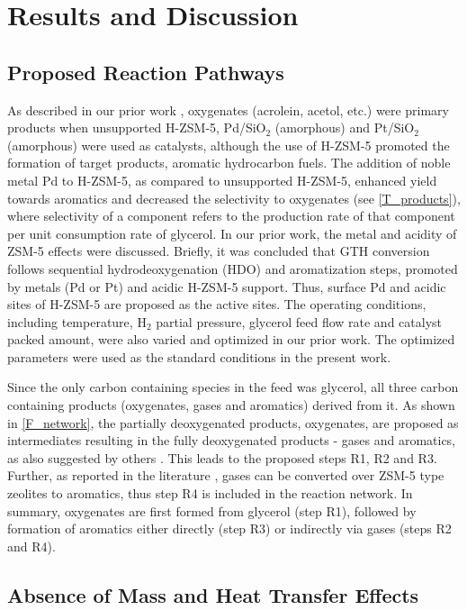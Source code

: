 \documentclass[journal=iecred,manuscript=article]{achemso}
\begin{document}
\section{Results and Discussion}

\subsection{Proposed Reaction Pathways}

As described in our prior work \cite{Xiao2016},
oxygenates (acrolein, acetol, etc.) were primary products when unsupported H-ZSM-5, Pd/SiO$_2$ (amorphous) and Pt/SiO$_2$ (amorphous) were used as catalysts,
although the use of H-ZSM-5 promoted the formation of target products, aromatic hydrocarbon fuels.
The addition of noble metal Pd to H-ZSM-5, as compared to unsupported H-ZSM-5,
enhanced yield towards aromatics and decreased the selectivity to oxygenates (see \ref{T_products}),
where selectivity of a component refers to the production rate of that component per unit consumption rate of glycerol.
In our prior work, the metal and acidity of ZSM-5 effects were discussed.
Briefly, it was concluded that GTH conversion follows sequential hydrodeoxygenation (HDO) and aromatization steps,
promoted by metals (Pd or Pt) and acidic H-ZSM-5 support.
Thus, surface Pd and acidic sites of H-ZSM-5 are proposed as the active sites.
The operating conditions, including temperature, H$_2$ partial pressure, glycerol feed flow rate and catalyst packed amount,
were also varied and optimized in our prior work.
The optimized parameters were used as the standard conditions in the present work. 

Since the only carbon containing species in the feed was glycerol,
all three carbon containing products (oxygenates, gases and aromatics) derived from it.
As shown in \ref{F_network}, the partially deoxygenated products, oxygenates,
are proposed as intermediates resulting in the fully deoxygenated products - gases and aromatics, as also suggested by others \cite{Tamiyakul2015, Wang2016}.
This leads to the proposed steps R1, R2 and R3.
Further, as reported in the literature \cite{Kitagawa1986, Ono1992, Choudhary2001},
gases can be converted over ZSM-5 type zeolites to aromatics, thus step R4 is included in the reaction network.
In summary, oxygenates are first formed from glycerol (step R1),
followed by formation of aromatics either directly (step R3) or indirectly via gases (steps R2 and R4).

\subsection{Absence of Mass and Heat Transfer Effects}
\end{document}
